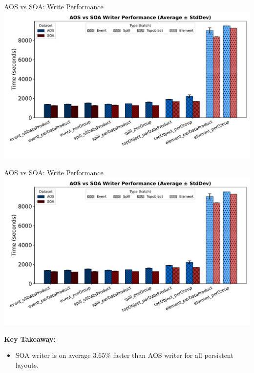 \documentclass[aspectratio=169]{beamer}
\begin{document}
\begin{frame}{AOS vs SOA: Write Performance}
  \centering
  \includegraphics[width=0.8\linewidth]{../experiments/Seaborn/AOS_SOA_Writer_grouped_with_gaps.pdf}
\end{frame}

\begin{frame}{AOS vs SOA: Write Performance}
  \centering
  \includegraphics[width=0.5\linewidth]{../experiments/Seaborn/AOS_SOA_Writer_grouped_with_gaps.pdf}

  \textbf{Key Takeaway:}
  \begin{itemize}
  \item SOA writer is on average $3.65\%$ faster than AOS writer for all persistent layouts.

  \end{itemize}
\end{frame}
\end{document}
